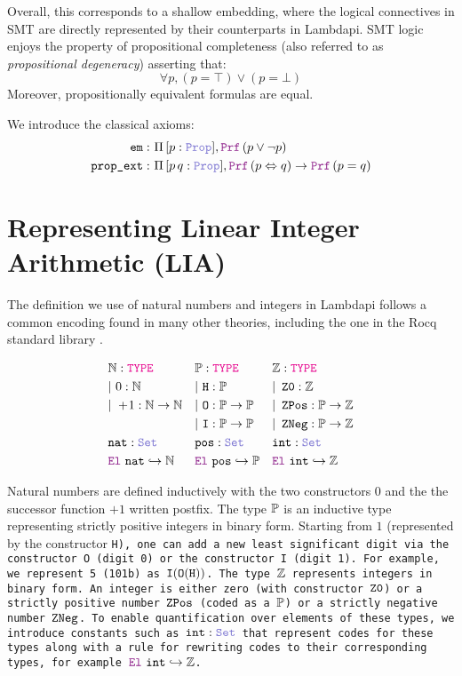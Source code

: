 Overall, this corresponds to a shallow embedding, where the logical connectives in SMT are directly represented by their counterparts in Lambdapi.
SMT logic enjoys the property of propositional completeness (also referred to as \emph{propositional degeneracy}) asserting that:
 \[
  \forall p,(p = \top) \lor (p = \bot)
\]
Moreover, propositionally equivalent formulas are equal.

\begin{definition}
We introduce the classical axioms:
\begin{align*}
\texttt{em}:\ & \Pi\, [p: \prop], \prf\,(p \lor \neg p) \\
\texttt{prop\_ext}:\ & \Pi\, [p\,q: \prop], \prf\,(p \Leftrightarrow q ) \rightarrow \prf\,(p = q)
\end{align*}
\label{def:classical-facts}
\end{definition}

\section{Representing Linear Integer Arithmetic (\textbf{\uppercase{LIA}})}
\label{ssec:encoding-lia}

\begin{definition}\label{def:ints}
The definition we use of natural numbers and integers in Lambdapi follows a common encoding found in many other theories, including the one in the Rocq standard library \cite{Rocq-refman}.

\begin{align*}\label{eq:eq1}
&\N: \type & &\bb{P}: \type & &\Z: \type \\
&|~0: \N  & &|~\tt{H} : \bb{P} & &|~\ZO: \Z \\
&|~+\!1:\N \ra \N & &|~\tt{O}: \bb{P} \ra \bb{P} & &|~\ZPos: \bb{P} \ra \Z \\
& & &|~\tt{I}: \bb{P} \ra \bb{P} & &|~\ZNeg: \bb{P} \ra \Z \\
&\tt{nat}: \set & &\tt{pos}: \set & &\tt{int}: \set \\
&\el~\tt{nat} \re \N & &\el~\tt{pos} \re \bb{P} & &\el~\tt{int} \re \Z
\end{align*}

Natural numbers are defined inductively with the two constructors $0$ and the the successor function $+\!1$ written postfix.
The type $\bb{P}$  is an inductive type representing strictly positive integers in binary form.
Starting from $1$ (represented by the constructor \tt{H}), one can add a new least significant digit via the constructor \tt{O} (digit 0) or the constructor \tt{I} (digit 1).
For example, we represent 5 (101b) as $\tt{I} (\tt{O} (\tt{H}))$. The type $\Z$ represents integers in binary form.
An integer is either zero (with constructor $\ZO$) or a strictly positive number $\ZPos$ (coded as a $\bb{P}$) or a strictly negative number $\ZNeg$.
To enable quantification over elements of these types, we introduce constants such as $\tt{int}:\set$ that represent codes for these types along with a rule for rewriting codes to their corresponding types, for example $\el~\tt{int} \re \Z$.
\end{definition}

